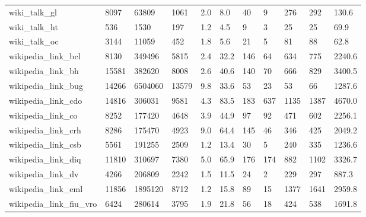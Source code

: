 \begin{longtable}{lllllllllll}
 wiki\_talk\_gl                                       & 8097       & 63809     & 1061  & 2.0    & 8.0    & 40    & 9      & 276    & 292    & 130.6   \\
 wiki\_talk\_ht                                       & 536        & 1530      & 197   & 1.2    & 4.5    & 9     & 3      & 25     & 25     & 69.9    \\
 wiki\_talk\_oc                                       & 3144       & 11059     & 452   & 1.8    & 5.6    & 21    & 5      & 81     & 88     & 62.8    \\
 wikipedia\_link\_bcl                                 & 8130       & 349496    & 5815  & 2.4    & 32.2   & 146   & 64     & 634    & 775    & 2240.6  \\
 wikipedia\_link\_bh                                  & 15581      & 382620    & 8008  & 2.6    & 40.6   & 140   & 70     & 666    & 829    & 3400.5  \\
 wikipedia\_link\_bug                                 & 14266      & 6504060   & 13579 & 9.8    & 33.6   & 53    & 23     & 53     & 66     & 1287.6  \\
 wikipedia\_link\_cdo                                 & 14816      & 306031    & 9581  & 4.3    & 83.5   & 183   & 637    & 1135   & 1387   & 4670.0  \\
 wikipedia\_link\_co                                  & 8252       & 177420    & 4648  & 3.9    & 44.9   & 97    & 92     & 471    & 602    & 2256.1  \\
 wikipedia\_link\_crh                                 & 8286       & 175470    & 4923  & 9.0    & 64.4   & 145   & 46     & 346    & 425    & 2049.2  \\
 wikipedia\_link\_csb                                 & 5561       & 191255    & 2509  & 1.2    & 13.4   & 30    & 5      & 240    & 335    & 1236.6  \\
 wikipedia\_link\_diq                                 & 11810      & 310697    & 7380  & 5.0    & 65.9   & 176   & 174    & 882    & 1102   & 3326.7  \\
 wikipedia\_link\_dv                                  & 4266       & 206809    & 2242  & 1.5    & 11.5   & 24    & 2      & 229    & 297    & 887.3   \\
 wikipedia\_link\_eml                                 & 11856      & 1895120   & 8712  & 1.2    & 15.8   & 89    & 15     & 1377   & 1641   & 2959.8  \\
 wikipedia\_link\_fiu\_vro                             & 6424       & 280614    & 3795  & 1.9    & 21.8   & 56    & 18     & 424    & 538    & 1691.8  \\

\end{longtable}
